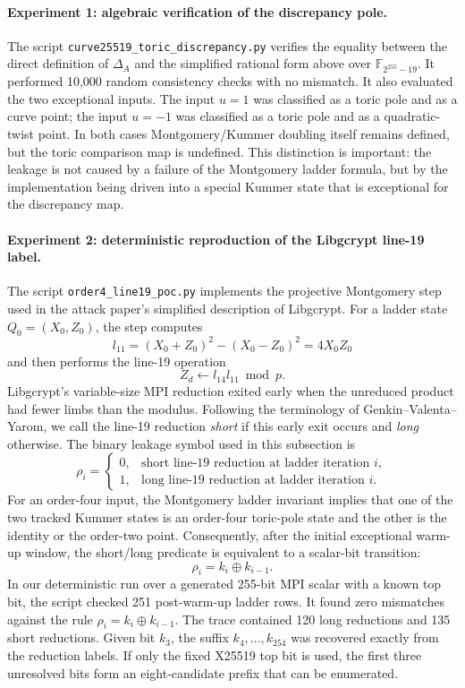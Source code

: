 \paragraph{Experiment 1: algebraic verification of the discrepancy pole.}
The script \texttt{curve25519\_toric\_discrepancy.py} verifies the equality
between the direct definition of \(\Delta_A\) and the simplified rational form
above over \(\mathbb{F}_{2^{255}-19}\).  It performed 10,000 random consistency
checks with no mismatch.  It also evaluated the two exceptional inputs.  The
input \(u=1\) was classified as a toric pole and as a curve point; the input
\(u=-1\) was classified as a toric pole and as a quadratic-twist point.  In both
cases Montgomery/Kummer doubling itself remains defined, but the toric
comparison map is undefined.  This distinction is important: the leakage is not
caused by a failure of the Montgomery ladder formula, but by the implementation
being driven into a special Kummer state that is exceptional for the discrepancy
map.

\paragraph{Experiment 2: deterministic reproduction of the Libgcrypt line-19 label.}
The script \texttt{order4\_line19\_poc.py} implements the projective Montgomery
step used in the attack paper's simplified description of Libgcrypt.  For a
ladder state \(Q_0=(X_0,Z_0)\), the step computes
\[
  l_{11}=(X_0+Z_0)^2-(X_0-Z_0)^2=4X_0Z_0
\]
and then performs the line-19 operation
\[
  Z_d \leftarrow l_{14}l_{11}\bmod p .
\]
Libgcrypt's variable-size MPI reduction exited early when the unreduced product
had fewer limbs than the modulus.  Following the terminology of
Genkin--Valenta--Yarom, we call the line-19 reduction \emph{short} if this early
exit occurs and \emph{long} otherwise.  The binary leakage symbol used in this
subsection is
\[
  \rho_i =
  \begin{cases}
    0, & \text{short line-19 reduction at ladder iteration } i,\\
    1, & \text{long line-19 reduction at ladder iteration } i.
  \end{cases}
\]
For an order-four input, the Montgomery ladder invariant implies that one of the
two tracked Kummer states is an order-four toric-pole state and the other is the
identity or the order-two point.  Consequently, after the initial exceptional
warm-up window, the short/long predicate is equivalent to a scalar-bit
transition:
\[
  \rho_i = k_i \oplus k_{i-1} .
\]
In our deterministic run over a generated 255-bit MPI scalar with a known top bit, the script checked 251
post-warm-up ladder rows.  It found zero mismatches against the rule
\(\rho_i=k_i\oplus k_{i-1}\).  The trace contained 120 long reductions and 135
short reductions.  Given bit \(k_3\), the suffix \(k_4,\ldots,k_{254}\) was
recovered exactly from the reduction labels.  If only the fixed X25519 top bit
is used, the first three unresolved bits form an eight-candidate prefix that can
be enumerated.


